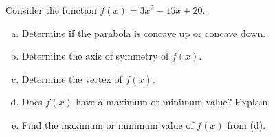 \documentclass[12pt,letterpaper]{exam}
\begin{document}
\begin{questions}
\newpage



\newpage
\question[10] Consider the function $f(x)= 3x^2 - 15x + 20$. 
	\begin{enumerate}[(a)]
	\item Determine if the parabola is concave up or concave down. 
	\item Determine the axis of symmetry of $f(x)$. 
	\item Determine the vertex of $f(x)$.
	\item Does $f(x)$ have a maximum or minimum value? Explain. 
	\item Find the maximum or minimum value of $f(x)$ from (d).  
	\end{enumerate}


\end{questions}
\end{document}
